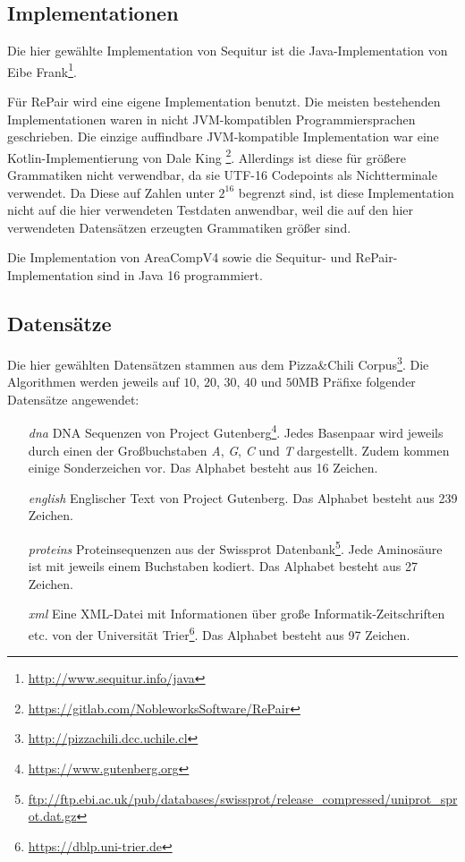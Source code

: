 \subsection{Implementationen}

Die hier gewählte Implementation von Sequitur ist die Java-Implementation von Eibe Frank\footnote{\url{http://www.sequitur.info/java}}. 

Für RePair wird eine eigene Implementation benutzt. Die meisten bestehenden Implementationen waren in nicht JVM-kompatiblen Programmiersprachen geschrieben. 
Die einzige auffindbare JVM-kompatible Implementation war eine Kotlin-Implementierung von Dale King \footnote{\url{https://gitlab.com/NobleworksSoftware/RePair}}. Allerdings ist diese für größere Grammatiken nicht verwendbar, da sie UTF-16 Codepoints als Nichtterminale verwendet. Da Diese auf Zahlen unter $2^16$ begrenzt sind, ist diese Implementation nicht auf die hier verwendeten Testdaten anwendbar, weil die auf den hier verwendeten Datensätzen erzeugten Grammatiken größer sind.

Die Implementation von AreaCompV4 sowie die Sequitur- und RePair-Implementation sind in Java 16 programmiert.

\subsection{Datensätze}

Die hier gewählten Datensätzen stammen aus dem Pizza\&Chili Corpus\footnote{\url{http://pizzachili.dcc.uchile.cl}}. Die Algorithmen werden jeweils auf $10$, $20$, $30$, $40$ und $50$MB Präfixe folgender Datensätze angewendet:

\begin{itemize}[leftmargin=2cm]
    \item[\emph{dna}] DNA Sequenzen von Project Gutenberg\footnote{\label{footnotegutenberg}\url{https://www.gutenberg.org}}. Jedes Basenpaar wird jeweils durch einen der Großbuchstaben \emph{A}, \emph{G}, \emph{C} und \emph{T} dargestellt. Zudem kommen einige Sonderzeichen vor. Das Alphabet besteht aus 16 Zeichen.
    \item[\emph{english}] Englischer Text von Project Gutenberg. Das Alphabet besteht aus 239 Zeichen.
    \item[\emph{proteins}] Proteinsequenzen aus der Swissprot Datenbank\footnote{\url{ftp://ftp.ebi.ac.uk/pub/databases/swissprot/release_compressed/uniprot_sprot.dat.gz}}. Jede Aminosäure ist mit jeweils einem Buchstaben kodiert. Das Alphabet besteht aus 27 Zeichen.
    \item[\emph{xml}] Eine XML-Datei mit Informationen über große Informatik-Zeitschriften etc. von der Universität Trier\footnote{\url{https://dblp.uni-trier.de}}. Das Alphabet besteht aus 97 Zeichen.
\end{itemize}

